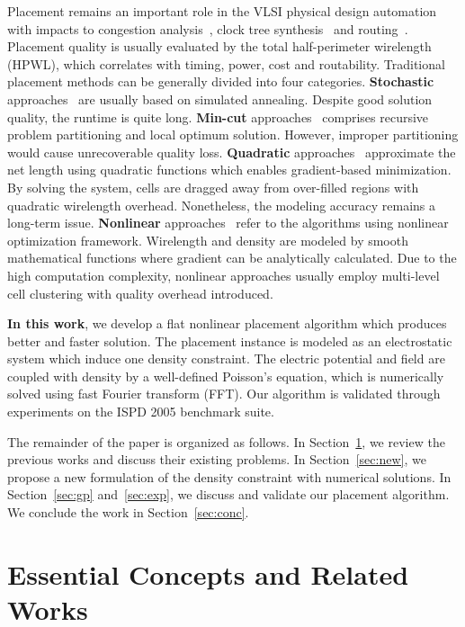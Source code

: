 \documentclass[conference,10pt]{IEEEtran}
\newcounter{def}
\begin{document}
Placement remains an important role in the 
VLSI physical design automation~\cite{abk} 
with impacts to congestion analysis~\cite{cp00},
clock tree synthesis~\cite{dmst}
and routing~\cite{lmgr}.
Placement quality is usually evaluated by
the total half-perimeter wirelength (HPWL), 
which correlates with timing, power, cost and 
routability.
Traditional placement methods can be generally divided 
into four categories.
{\bf Stochastic} approaches~\cite{timberwolf}
are usually based on simulated annealing. 
Despite good solution quality, the runtime is quite long. 
{\bf Min-cut} approaches~\cite{capo} comprises 
recursive problem partitioning and local optimum solution. 
However, improper partitioning would cause 
unrecoverable quality loss.
{\bf Quadratic} approaches~\cite{simpl,rql,fp3} 
approximate the net length using quadratic 
functions 
which enables gradient-based minimization.
By solving the system, 
cells are dragged away from over-filled regions 
with quadratic wirelength overhead. 
Nonetheless, the modeling accuracy remains a long-term issue.
{\bf Nonlinear} approaches~\cite{mpl6,ntupl3,aplace2} refer
to the algorithms using nonlinear optimization framework. 
Wirelength and density are modeled by smooth mathematical functions 
where gradient can be analytically calculated.
Due to the high computation complexity,
nonlinear approaches usually employ multi-level cell
clustering with quality overhead introduced. 

{\bf In this work}, 
we develop a flat nonlinear
placement algorithm 
which produces better and faster solution. 
The placement instance 
is modeled as an electrostatic system 
which induce one density constraint. 
The electric potential and field are coupled with density 
by a well-defined Poisson's equation, which is numerically 
solved using fast Fourier transform (FFT). 
Our algorithm is validated through experiments 
on the ISPD 2005 benchmark suite.

The remainder of the paper is organized as follows.
In Section~\ref{sec:ana}, 
we review the previous works 
and discuss their existing problems. 
In Section~\ref{sec:new}, 
we propose a new formulation of the density constraint 
with numerical solutions.
In Section~\ref{sec:gp} and~\ref{sec:exp}, 
we discuss and validate our placement algorithm.
We conclude the work in Section~\ref{sec:conc}.



\section{Essential Concepts and Related Works}
\label{sec:ana}
\end{document}
